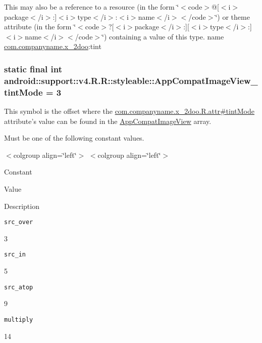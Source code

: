This may also be a reference to a resource (in the form \char`\"{}$<$code$>$@\mbox{[}$<$i$>$package$<$/i$>$:\mbox{]}$<$i$>$type$<$/i$>$:$<$i$>$name$<$/i$>$$<$/code$>$\char`\"{}) or theme attribute (in the form \char`\"{}$<$code$>$?\mbox{[}$<$i$>$package$<$/i$>$:\mbox{]}\mbox{[}$<$i$>$type$<$/i$>$:\mbox{]}$<$i$>$name$<$/i$>$$<$/code$>$\char`\"{}) containing a value of this type.  name \hyperlink{namespacecom_1_1companyname_1_1x__2doo}{com.companyname.x\_\-2doo}:tint \hypertarget{classandroid_1_1support_1_1v4_1_1_r_1_1styleable_335facec4026e5e7aefa8541f5121cc2}{
\subsubsection[{AppCompatImageView\_\-tintMode}]{\setlength{\rightskip}{0pt plus 5cm}static final int android::support::v4.R.R::styleable::AppCompatImageView\_\-tintMode = 3}}
\label{classandroid_1_1support_1_1v4_1_1_r_1_1styleable_335facec4026e5e7aefa8541f5121cc2}


This symbol is the offset where the \hyperlink{classcom_1_1companyname_1_1x__2doo_1_1_r_1_1attr_868f3e42c76b8f45c9b87ae88a5741aa}{com.companyname.x\_\-2doo.R.attr\#tintMode} attribute's value can be found in the \hyperlink{classandroid_1_1support_1_1v4_1_1_r_1_1styleable_6785f800ea84c577c1f75fe389b114f0}{AppCompatImageView} array.

Must be one of the following constant values. \begin{TabularC}{0}
\hline
\end{TabularC}
$<$colgroup align=\char`\"{}left\char`\"{}$>$ $<$colgroup align=\char`\"{}left\char`\"{}$>$ 

Constant

Value

Description 

{\tt src\_\-over}

3

{\tt src\_\-in}

5

{\tt src\_\-atop}

9

{\tt multiply}

14

